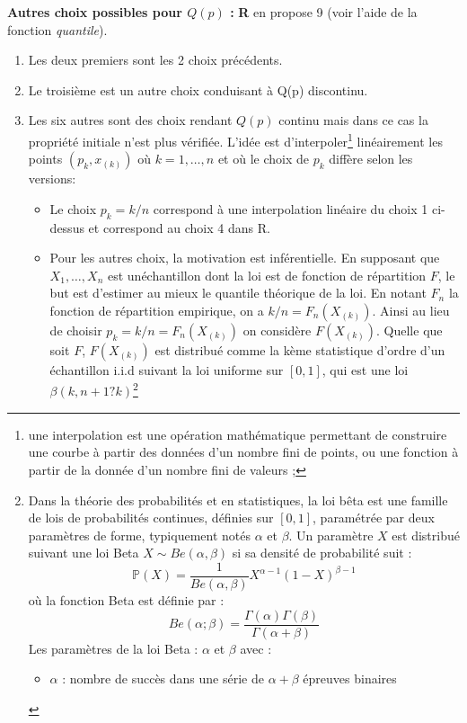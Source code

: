 \begin{itemize}
\textbf{Autres choix possibles pour $Q(p)$ : } \textbf{R} en propose 9 (voir l'aide de la fonction \textit{quantile}).
\begin{enumerate}
\item Les deux premiers sont les 2 choix précédents.
\item Le troisième est un autre choix conduisant à Q(p) discontinu.
\item Les six autres sont des choix rendant $Q(p)$ continu mais dans ce cas la propriété initiale n'est plus vérifiée.\newline
L'idée est d'interpoler\footnote{une interpolation est une opération mathématique permettant de construire une courbe à partir des données d'un nombre fini de points, ou une fonction à partir de la donnée d'un nombre fini de valeurs ;} linéairement les points $(p_{k} , x_{(k)})$ où $k = 1, \dots, n$ et où le choix de $p_{k}$ diffère selon les versions:
\begin{itemize}
\item Le choix $p_{k} = k/n$ correspond à une interpolation linéaire du choix 1 ci-dessus et correspond au choix 4 dans R.
\item Pour les autres choix, la motivation est inférentielle. En supposant que $X_{1},\dots,X_{n}$ est unéchantillon dont la loi est de fonction de répartition $F$, le but est d'estimer au mieux le quantile théorique de la loi.\newline
En notant $F_{n}$ la fonction de répartition empirique, on a $k/n = F_{n}(X_{(k)})$. Ainsi au lieu de choisir $p_{k} = k/n = F_{n}(X_{(k)})$ on considère $F(X_{(k)})$. Quelle que soit $F$, $F(X_{(k)})$ est distribué comme la kème statistique d'ordre d'un échantillon i.i.d suivant la loi uniforme sur $[0, 1]$, qui est une loi $\beta(k,n+1?k)$\footnote{Dans la théorie des probabilités et en statistiques, la loi bêta est une famille de lois de probabilités continues, définies sur $[0,1]$, paramétrée par deux paramètres de forme, typiquement notés $\alpha$ et $\beta$.\newline
Un paramètre $X$ est distribué suivant une loi Beta $X \sim Be (\alpha,\beta)$ si sa densité de probabilité suit :
$$ \mathbb{P}(X) = \frac{1}{Be(\alpha,\beta)} X^{\alpha-1} (1-X)^{\beta - 1}$$ 
où la fonction Beta est définie par :
$$Be(\alpha;\beta) = \frac{\Gamma(\alpha)\Gamma(\beta)}{\Gamma(\alpha + \beta)}$$ 
Les paramètres de la loi Beta : $\alpha$ et $\beta$ avec : 
\begin{itemize}
\item $\alpha$ : nombre de succès dans une série de $\alpha + \beta$ épreuves binaires

\end{itemize}}
\end{itemize}
\end{enumerate}
\end{itemize}
